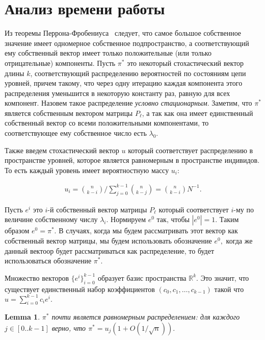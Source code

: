 \documentclass[russian]{article}
\newtheorem{lemma}{Lemma}
\begin{document}
\section{Анализ времени работы}

Из теоремы Перрона-Фробениуса~\cite{} следует, что самое большое собственное значение имеет одномерное собственное подпространство, а соответствующий ему собственный вектор имеет только положительные (или только отрицательные) компоненты. Пусть $\pi^*$ это некоторый стохастический вектор длины $k$, соответствующий распределению вероятностей по состояниям цепи уровней, причем такому, что через одну итерацию каждая компонента этого распределения уменьшится в некоторую константу раз, равную для всех компонент. Назовем такое распределение \textit{условно стационарным}. Заметим, что $\pi^*$ является собственным вектором матрицы $P_\ell$, а так как она имеет единственный собственный вектор со всеми положительными компонентами, то соответствующее ему собственное число есть $\lambda_0.$

Также введем стохастический вектор $u$ который соответствует распределению в пространстве уровней, которое является равномерным в пространстве индивидов. То есть каждый уровень имеет вероятностную массу $u_i:$

\begin{align*}
  u_i = \binom{n}{k - i} / \sum\limits_{j = 0}^{k - 1} \binom{n}{k - j} = \binom{n}{k - i}N^{-1}.
\end{align*}

Пусть $e^i$ это $i$-й собственный вектор матрицы $P_\ell$ который соответствует $i$-му по величине собственному числу $\lambda_i.$ Нормируем $e^0$ так, чтобы $|e^0| = 1.$ Таким образом $e^0 = \pi^*.$ В случаях, когда мы будем рассматривать этот вектор как собственный вектор матрицы, мы будем использовать обозначение $e^0,$ когда же данный вектоор будет рассматриваться как распределение, то будет использоваться обозначение $\pi^*.$

Множество векторов $\{e^i\}_{i = 0}^{k - 1}$ образует базис пространства $\mathbb{R}^k.$  Это значит, что существует единственный набор коэффициентов $(c_0, c_1, \dots, c_{k - 1})$ такой что $u = \sum\limits_{i = 0}^{k - 1} c_i e^i.$

\begin{lemma}\label{lemma_uniform}
$\pi^*$ почти является равномерным распределением: для каждого $j \in [0..k-1]$ верно, что $\pi^* = u_j (1 + O(1/\sqrt{n})).$
\end{lemma}
\end{document}
